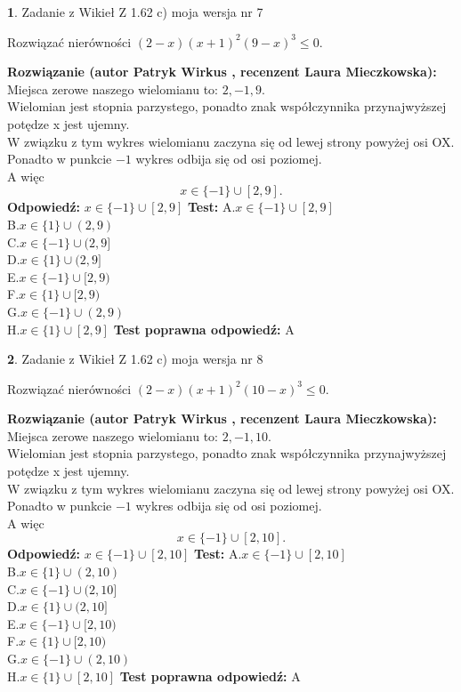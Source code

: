 \documentclass[12pt, a4paper]{article}
\theoremstyle{definition} %
\newtheorem{zad}{}
\newcommand{\zadStart}[1]{\begin{zad}#1\newline}
\newcommand{\zadStop}{\end{zad}}
\newcommand{\rozwStart}[2]{\noindent \textbf{Rozwiązanie (autor #1 , recenzent #2): }\newline}
\newcommand{\rozwStop}{\newline}
\newcommand{\odpStart}{\noindent \textbf{Odpowiedź:}\newline}
\newcommand{\odpStop}{\newline}
\newcommand{\testStart}{\noindent \textbf{Test:}\newline}
\newcommand{\testStop}{\newline}
\newcommand{\kluczStart}{\noindent \textbf{Test poprawna odpowiedź:}\newline}
\newcommand{\kluczStop}{\newline}
\begin{document}
\zadStart{Zadanie z Wikieł Z 1.62 c) moja wersja nr 7}

Rozwiązać nierówności $(2-x)(x+1)^{2}(9-x)^{3}\le0$.
\zadStop
\rozwStart{Patryk Wirkus}{Laura Mieczkowska}
Miejsca zerowe naszego wielomianu to: $2, -1, 9$.\\
Wielomian jest stopnia parzystego, ponadto znak współczynnika przy\linebreak najwyższej potędze x jest ujemny.\\ W związku z tym wykres wielomianu zaczyna się od lewej strony powyżej osi OX.\\
Ponadto w punkcie $-1$ wykres odbija się od osi poziomej.\\
A więc $$x \in \{-1\} \cup [2,9].$$
\rozwStop
\odpStart
$x \in \{-1\} \cup [2,9]$
\odpStop
\testStart
A.$x \in \{-1\} \cup [2,9]$\\
B.$x \in \{1\} \cup (2,9)$\\
C.$x \in \{-1\} \cup (2,9]$\\
D.$x \in \{1\} \cup (2,9]$\\
E.$x \in \{-1\} \cup [2,9)$\\
F.$x \in \{1\} \cup [2,9)$\\
G.$x \in \{-1\} \cup (2,9)$\\
H.$x \in \{1\} \cup [2,9]$
\testStop
\kluczStart
A
\kluczStop



\zadStart{Zadanie z Wikieł Z 1.62 c) moja wersja nr 8}

Rozwiązać nierówności $(2-x)(x+1)^{2}(10-x)^{3}\le0$.
\zadStop
\rozwStart{Patryk Wirkus}{Laura Mieczkowska}
Miejsca zerowe naszego wielomianu to: $2, -1, 10$.\\
Wielomian jest stopnia parzystego, ponadto znak współczynnika przy\linebreak najwyższej potędze x jest ujemny.\\ W związku z tym wykres wielomianu zaczyna się od lewej strony powyżej osi OX.\\
Ponadto w punkcie $-1$ wykres odbija się od osi poziomej.\\
A więc $$x \in \{-1\} \cup [2,10].$$
\rozwStop
\odpStart
$x \in \{-1\} \cup [2,10]$
\odpStop
\testStart
A.$x \in \{-1\} \cup [2,10]$\\
B.$x \in \{1\} \cup (2,10)$\\
C.$x \in \{-1\} \cup (2,10]$\\
D.$x \in \{1\} \cup (2,10]$\\
E.$x \in \{-1\} \cup [2,10)$\\
F.$x \in \{1\} \cup [2,10)$\\
G.$x \in \{-1\} \cup (2,10)$\\
H.$x \in \{1\} \cup [2,10]$
\testStop
\kluczStart
A
\kluczStop
\end{document}
